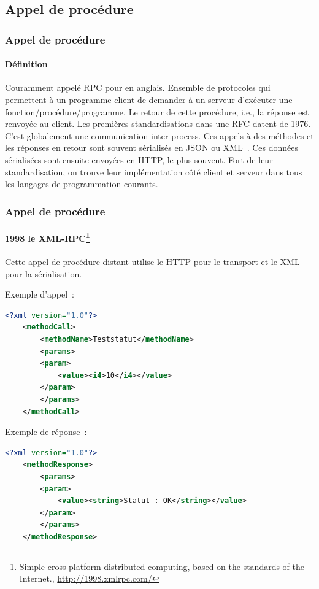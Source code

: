 \documentclass{beamer}
\begin{document}
    \subsection{Appel de procédure}\label{subsec:rpc}

    \begin{frame}
        \transdissolve
        \frametitle{Appel de procédure}
        \framesubtitle{Définition}
        Couramment appelé RPC pour  en anglais.
        \bigbreak
        Ensemble de protocoles qui permettent à un programme client de demander à un serveur d'exécuter une fonction/procédure/programme.
        Le retour de cette procédure, i.e., la réponse est renvoyée au client.
        \bigbreak
        Les premières standardisations dans une RFC datent de 1976.
        \bigbreak
        C'est globalement une communication inter-process.
        \bigbreak
        Ces appels à des méthodes et les réponses en retour sont souvent sérialisés en JSON ou XML~.
        Ces données sérialisées sont ensuite envoyées en HTTP, le plus souvent.
        \bigbreak
        Fort de leur standardisation, on trouve leur implémentation côté client et serveur dans tous les langages de programmation courants.
    \end{frame}

    \begin{frame}[fragile]
        \transdissolve
        \frametitle{Appel de procédure}
        \framesubtitle{1998 le XML-RPC\footnote{Simple cross-platform distributed computing, based on the standards of the Internet., \url{http://1998.xmlrpc.com/}}}
        Cette appel de procédure distant utilise le HTTP pour le transport et le XML pour la sérialisation.

        Exemple d'appel~:
        \begin{lstlisting}[language=xml,basicstyle=\ttfamily\tiny]
<?xml version="1.0"?>
    <methodCall>
        <methodName>Teststatut</methodName>
        <params>
        <param>
            <value><i4>10</i4></value>
        </param>
        </params>
    </methodCall>
        \end{lstlisting}
        Exemple de réponse~:
        \begin{lstlisting}[language=xml,basicstyle=\ttfamily\tiny]
<?xml version="1.0"?>
    <methodResponse>
        <params>
        <param>
            <value><string>Statut : OK</string></value>
        </param>
        </params>
    </methodResponse>
        \end{lstlisting}
    \end{frame}
\end{document}
